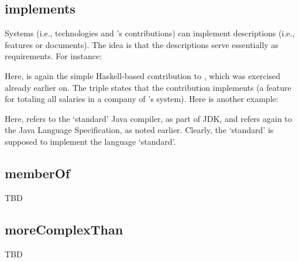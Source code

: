 
\subsection{implements}

Systems (i.e., technologies and \ooo{}'s contributions) can implement
descriptions (i.e., features or documents). The idea is that the
descriptions serve essentially as requirements. For instance:


\noindent
Here,  is again the simple Haskell-based
contribution to \ooo{}, which was exercised already earlier on. The
triple states that the contribution implements  (a
feature for totaling all salaries in a company of \ooo{}'s
system). Here is another example:


\noindent
Here,  refers to the `standard' Java compiler, as part
of JDK, and  refers again to the Java Language
Specification, as noted earlier. Clearly, the `standard' is supposed
to implement the language `standard'.


\subsection{memberOf}

TBD

\begin{comment}
Members of a theme
Members of a vocabulary
Members of a course
\end{comment}


\subsection{moreComplexThan}

TBD

\begin{comment}
Aha, moreComplexThan!?
- A contribution being more complex than another contribution
- A feature being more complex than another feature
- Does this sound like something applicable to language subset relationship?
\end{comment}

